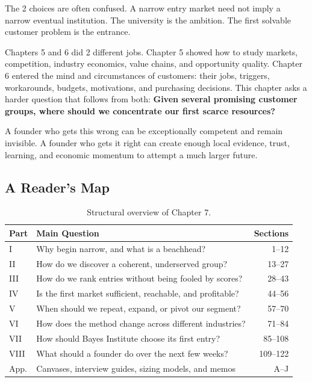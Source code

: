 The 2 choices are often confused. A narrow entry market need not imply a narrow eventual institution. The university is the ambition. The first solvable customer problem is the entrance.

Chapters 5 and 6 did 2 different jobs. Chapter 5 showed how to study markets, competition, industry economics, value chains, and opportunity quality. Chapter 6 entered the mind and circumstances of customers: their jobs, triggers, workarounds, budgets, motivations, and purchasing decisions. This chapter asks a harder question that follows from both: \textbf{Given several promising customer groups, where should we concentrate our first scarce resources?}

A founder who gets this wrong can be exceptionally competent and remain invisible. A founder who gets it right can create enough local evidence, trust, learning, and economic momentum to attempt a much larger future.

\subsection*{A Reader's Map}

\begin{table}[htbp]
\centering
\small
\begin{tabularx}{\columnwidth}{l X r}
\toprule
\textbf{Part} & \textbf{Main Question} & \textbf{Sections} \\
\midrule
I & Why begin narrow, and what is a beachhead? & 1--12 \\
II & How do we discover a coherent, underserved group? & 13--27 \\
III & How do we rank entries without being fooled by scores? & 28--43 \\
IV & Is the first market sufficient, reachable, and profitable? & 44--56 \\
V & When should we repeat, expand, or pivot our segment? & 57--70 \\
VI & How does the method change across different industries? & 71--84 \\
VII & How should Bayes Institute choose its first entry? & 85--108 \\
VIII & What should a founder do over the next few weeks? & 109--122 \\
App. & Canvases, interview guides, sizing models, and memos & A--J \\
\bottomrule
\end{tabularx}
\caption{Structural overview of Chapter 7.}
\label{tab:ch7-readers-map}
\end{table}

